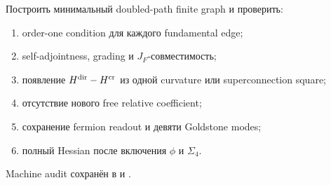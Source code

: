 \begin{protocol}
Построить минимальный doubled-path finite graph и проверить:
\begin{enumerate}
 \item order-one condition для каждого fundamental edge;
 \item self-adjointness, grading и \(J_F\)-совместимость;
 \item появление \(H^{\rm dir}-H^{\rm cr}\) из одной curvature или
 superconnection square;
 \item отсутствие нового free relative coefficient;
 \item сохранение fermion readout и девяти Goldstone modes;
 \item полный Hessian после включения \(\phi\) и \(\Sigma_4\).
\end{enumerate}
\end{protocol}

Machine audit сохранён в
 и
.